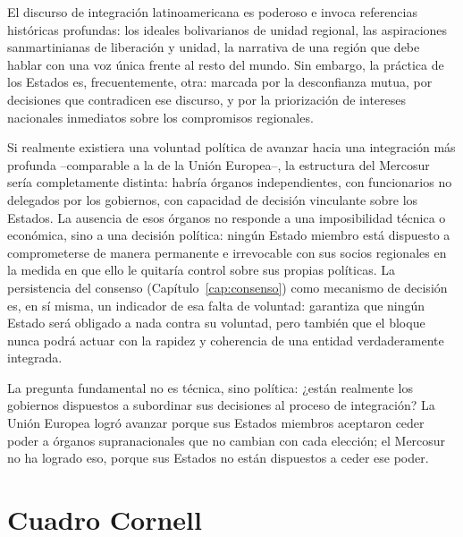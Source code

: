 \documentclass[12pt,oneside]{book}
\begin{document}
El discurso de integración latinoamericana es poderoso e invoca referencias históricas profundas: los ideales bolivarianos de unidad regional, las aspiraciones sanmartinianas de liberación y unidad, la narrativa de una región que debe hablar con una voz única frente al resto del mundo. Sin embargo, la práctica de los Estados es, frecuentemente, otra: marcada por la desconfianza mutua, por decisiones que contradicen ese discurso, y por la priorización de intereses nacionales inmediatos sobre los compromisos regionales.

Si realmente existiera una voluntad política de avanzar hacia una integración más profunda --comparable a la de la Unión Europea--, la estructura del Mercosur sería completamente distinta: habría órganos independientes, con funcionarios no delegados por los gobiernos, con capacidad de decisión vinculante sobre los Estados. La ausencia de esos órganos no responde a una imposibilidad técnica o económica, sino a una decisión política: ningún Estado miembro está dispuesto a comprometerse de manera permanente e irrevocable con sus socios regionales en la medida en que ello le quitaría control sobre sus propias políticas. La persistencia del consenso (Capítulo~\ref{cap:consenso}) como mecanismo de decisión es, en sí misma, un indicador de esa falta de voluntad: garantiza que ningún Estado será obligado a nada contra su voluntad, pero también que el bloque nunca podrá actuar con la rapidez y coherencia de una entidad verdaderamente integrada.

\begin{importante}
La pregunta fundamental no es técnica, sino política: ¿están realmente los gobiernos dispuestos a subordinar sus decisiones al proceso de integración? La Unión Europea logró avanzar porque sus Estados miembros aceptaron ceder poder a órganos supranacionales que no cambian con cada elección; el Mercosur no ha logrado eso, porque sus Estados no están dispuestos a ceder ese poder.
\end{importante}

\section{Cuadro Cornell}
\end{document}
